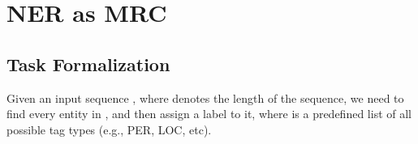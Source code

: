 \documentclass[11pt,a4paper]{article}
\begin{document}
\begin{comment}

\section{Preliminaries} 

In this section, we will briefly go through some background techniques of named entity recognition and machine reading comprehension. 
\subsection{NER as Sequence Labeling} 
Flat
 NER is standardly formalized  as a char-by-char or word-by-word sequence labeling task, in which the assigned labels capture both the boundary and the type. 
Let  denote the source input of words or characters sequence , where  represents the length of the sequence.
Let  denote the golden label sequence , where the length of golden labels is equal to the length of the input.  


Sequence labeling models assign a label  to each token in the input , resulting in a sequence of . 
For sequence labeling tasks, it is beneficial to consider the correlations between labels in neighborhoods and jointly decode the best chain of labels for a given input sequence. 
Therefore, many previous works employ a condition random field layer (CRF) \cite{lafferty2001conditional} on the top of RNN layers \cite{ma2016end, chiu2016named}.  
Models with CRF are trained by maximizing the log probability of the gold sequence. 
And the Viterbi algorithm is often adopted to search for the label sequence  with the highest conditional probability for decoding.  
Many previous works \cite{ratinov2009design, lample2016ner, dai2015ner} use the  tagging scheme instead of standard  and report performance enhancement with this scheme. 
\subsection{BERT-based Machine Reading Comprehension} 
\end{comment}





\section{NER as MRC}
\subsection{Task Formalization}
Given an input sequence , where  denotes the length of the sequence, we need to find every entity in , and then assign a label  to it, where  is a predefined list of all possible tag types (e.g., PER, LOC, etc). 
\end{document}
